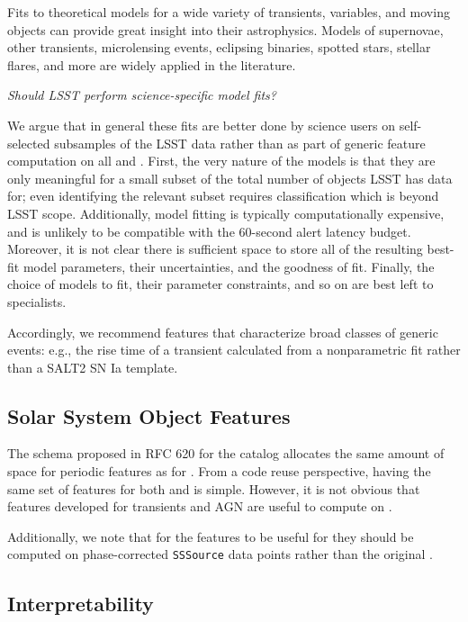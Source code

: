 \documentclass[DM,authoryear,toc]{lsstdoc}
\begin{document}
Fits to theoretical models for a wide variety of transients, variables, and moving objects can provide great insight into their astrophysics.
Models of supernovae, other transients, microlensing events, eclipsing binaries, spotted stars, stellar flares, and more are widely applied in the literature.

\textit{Should LSST perform science-specific model fits?}

We argue that in general these fits are better done by science users on self-selected subsamples of the LSST data rather than as part of generic feature computation on all \DIAObjects and \Objects.
First, the very nature of the models is that they are only meaningful for a small subset of the total number of objects LSST has data for; even identifying the relevant subset requires classification which is beyond LSST scope.  
Additionally, model fitting is typically computationally expensive, and is unlikely to be compatible with the 60-second alert latency budget.
Moreover, it is not clear there is sufficient space to store all of the resulting best-fit model parameters, their uncertainties, and the goodness of fit.
Finally, the choice of models to fit, their parameter constraints, and so on are best left to specialists.

Accordingly, we recommend features that characterize broad classes of generic events: e.g., the rise time of a transient calculated from a nonparametric fit rather than a SALT2 SN Ia template.


\subsection{Solar System Object Features}

The schema proposed in RFC 620 for the \SSObject catalog allocates the same amount of space for periodic 
features as for \DIAObjects.
From a code reuse perspective, having the same set of features for both \DIAObjects and \SSObjects is simple.
However, it is not obvious that features developed for transients and AGN are useful to compute on \SSObjects.

Additionally, we note that for the features to be useful for \SSObjects they should be computed on phase-corrected \texttt{SSSource} data points rather than the original \DIASources.

\subsection{Interpretability} \label{sec:interpretability}
\end{document}
